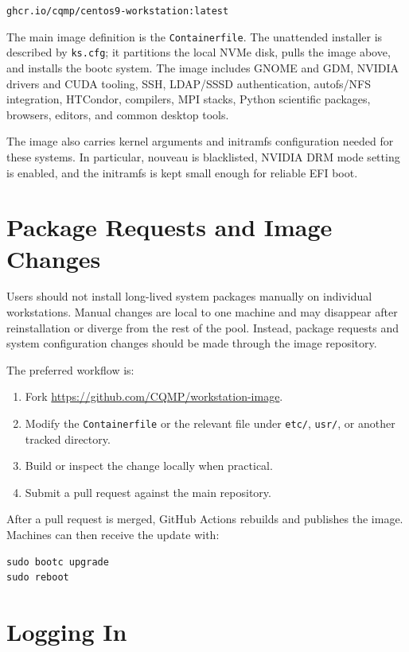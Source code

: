 \documentclass[11pt]{article}
\begin{document}
\begin{center}
\texttt{ghcr.io/cqmp/centos9-workstation:latest}
\end{center}

The main image definition is the \texttt{Containerfile}.  The unattended
installer is described by \texttt{ks.cfg}; it partitions the local NVMe disk,
pulls the image above, and installs the bootc system.  The image includes GNOME
and GDM, NVIDIA drivers and CUDA tooling, SSH, LDAP/SSSD authentication,
autofs/NFS integration, HTCondor, compilers, MPI stacks, Python scientific
packages, browsers, editors, and common desktop tools.

The image also carries kernel arguments and initramfs configuration needed for
these systems.  In particular, nouveau is blacklisted, NVIDIA DRM mode setting
is enabled, and the initramfs is kept small enough for reliable EFI boot.

\section{Package Requests and Image Changes}

Users should not install long-lived system packages manually on individual
workstations.  Manual changes are local to one machine and may disappear after
reinstallation or diverge from the rest of the pool.  Instead, package requests
and system configuration changes should be made through the image repository.

The preferred workflow is:

\begin{enumerate}
  \item Fork \url{https://github.com/CQMP/workstation-image}.
  \item Modify the \texttt{Containerfile} or the relevant file under
        \texttt{etc/}, \texttt{usr/}, or another tracked directory.
  \item Build or inspect the change locally when practical.
  \item Submit a pull request against the main repository.
\end{enumerate}

After a pull request is merged, GitHub Actions rebuilds and publishes the image.
Machines can then receive the update with:

\begin{verbatim}
sudo bootc upgrade
sudo reboot
\end{verbatim}

\section{Logging In}
\end{document}
